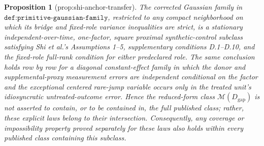 \documentclass{article}
\newtheorem{proposition}{Proposition}
\begin{document}
\begin{proposition}[prop:shi-anchor-transfer]\label{prop:shi-anchor-transfer}
The corrected Gaussian family in \(\texttt{def:primitive-gaussian-family}\), restricted to any compact neighborhood on which its bridge and fixed-role variance inequalities are strict, is a stationary independent-over-time, one-factor, square proximal synthetic-control subclass satisfying Shi et al.'s Assumptions 1--5, supplementary conditions D.1--D.10, and the fixed-role full-rank condition for either predeclared role.  The same conclusion holds row by row for a diagonal constant-effect family in which the donor and supplemental-proxy measurement errors are independent conditional on the factor and the exceptional centered rare-jump variable occurs only in the treated unit's idiosyncratic untreated-outcome error.  Hence the reduced-form class \(\mathcal M(D_{\mathrm{gap}})\) is not asserted to contain, or to be contained in, the full published class; rather, these explicit laws belong to their intersection.  Consequently, any coverage or impossibility property proved separately for these laws also holds within every published class containing this subclass.
\end{proposition}
\end{document}
